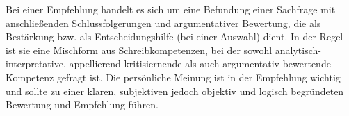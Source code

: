 



\thispagestyle{plain}



Bei einer Empfehlung handelt es sich um eine Befundung einer Sachfrage mit anschlie\ss{}enden Schlussfolgerungen und argumentativer Bewertung, die als Best\"{a}rkung bzw. als Entscheidungshilfe (bei einer Auswahl) dient. In der Regel ist sie eine Mischform aus Schreibkompetenzen, bei der sowohl analytisch-interpretative, appellierend-kritisiernende als auch argumentativ-bewertende Kompetenz gefragt ist. Die pers\"{o}nliche Meinung ist in der Empfehlung wichtig und sollte zu einer klaren, subjektiven jedoch objektiv und logisch begr\"{u}ndeten Bewertung und Empfehlung f\"{u}hren.


